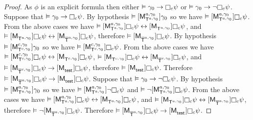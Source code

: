 \begin{proof}
As $\phi$ is an explicit formula then either $\entails \gamma_0 \implies \necessaryC \psi$ or $\entails \gamma_0 \implies \lnot \necessaryC \psi$.
Suppose that $\entails \gamma_0 \implies \necessaryC \psi$.
By hypothesis $\entails \actionA{\aPModel[\agentA, \gamma_0]{\aStatesT[\agentA, \gamma_0]}} \gamma_0$ 
so we have $\entails \actionA{\aPModel[\agentA, \gamma_0]{\aStatesT[\agentA, \gamma_0]}} \necessaryC \psi$.
From the above cases we have
$\entails \actionA{\aPModel[\agentA, \gamma_0]{\aStatesT[\agentA, \gamma_0]}} \necessaryC \psi \iff \actionA{\aPModel{\aStatesT[\agentA, \gamma_0]}} \necessaryC \psi$, and
$\entails \actionA{\aPModel{\aStatesT[\agentA, \gamma_0]}} \necessaryC \psi \iff \actionA{\aPModel{\aPStatesT[\agentA, \gamma_0]}} \necessaryC \psi$, 
therefore $\entails \actionA{\aPModel{\aPStatesT[\agentA, \gamma_0]}} \necessaryC \psi$.
By hypothesis $\entails \actionA{\aPModel[\agentC, \gamma_0]{\aStatesT[\agentC, \gamma_0]}} \gamma_0$ 
so we have $\entails \actionA{\aPModel[\agentC, \gamma_0]{\aStatesT[\agentC, \gamma_0]}} \necessaryC \psi$.
From the above cases we have 
$\entails \actionA{\aPModel[\agentC, \gamma_0]{\aStatesT[\agentC, \gamma_0]}} \necessaryC \psi \iff \actionA{\aPModel{\aStatesT[\agentC, \gamma_0]}} \necessaryC \psi$, 
$\entails \actionA{\aPModel{\aStatesT[\agentC, \gamma_0]}} \necessaryC \psi \iff \actionA{\aPModel{\aPStatesT[\agentC, \gamma_0]}} \necessaryC \psi$, and
$\entails \actionA{\aPModel{\aPStatesT[\agentC, \gamma_0]}} \necessaryC \psi \implies \actionA{\aPModel{\aStateTest}} \necessaryC \psi$, 
therefore $\entails \actionA{\aPModel{\aStateTest}} \necessaryC \psi$.
Therefore $\entails \actionA{\aPModel{\aPStatesT[\agentA, \gamma_0]}} \necessaryC \psi \implies \actionA{\aPModel{\aStateTest}} \necessaryC \psi$.
Suppose that $\entails \gamma_0 \implies \lnot \necessaryC \psi$.
By hypothesis $\entails \actionA{\aPModel[\agentA, \gamma_0]{\aStatesT[\agentA, \gamma_0]}} \gamma_0$ 
so we have $\entails \actionA{\aPModel[\agentA, \gamma_0]{\aStatesT[\agentA, \gamma_0]}} \lnot \necessaryC \psi$ and
$\entails \lnot \actionA{\aPModel[\agentA, \gamma_0]{\aStatesT[\agentA, \gamma_0]}} \necessaryC \psi$.
From the above cases we have
$\entails \actionA{\aPModel[\agentA, \gamma_0]{\aStatesT[\agentA, \gamma_0]}} \necessaryC \psi \iff \actionA{\aPModel{\aStatesT[\agentA, \gamma_0]}} \necessaryC \psi$, and
$\entails \actionA{\aPModel{\aStatesT[\agentA, \gamma_0]}} \necessaryC \psi \iff \actionA{\aPModel{\aPStatesT[\agentA, \gamma_0]}} \necessaryC \psi$, 
therefore $\entails \lnot \actionA{\aPModel{\aPStatesT[\agentA, \gamma_0]}} \necessaryC \psi$.
Therefore $\entails \actionA{\aPModel{\aPStatesT[\agentA, \gamma_0]}} \necessaryC \psi \implies \actionA{\aPModel{\aStateTest}} \necessaryC \psi$.


\end{proof}
